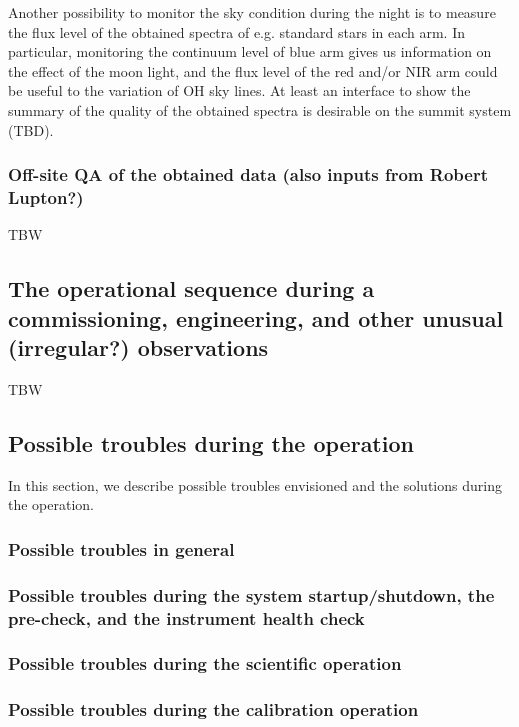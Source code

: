 \documentclass[a4paper]{article}
\begin{document}
Another possibility to monitor the sky condition during the night is to measure the flux level of the obtained spectra of e.g. standard stars in each arm. In particular, monitoring the continuum level of blue arm gives us information on the effect of the moon light, and the flux level of the red and/or NIR arm could be useful to the variation of OH sky lines. At least an interface to show the summary of the quality of the obtained spectra is desirable on the summit system (TBD).\\

\subsubsection{Off-site QA of the obtained data (also inputs from Robert Lupton?)}
TBW

\subsection{The operational sequence during a commissioning, engineering, and other unusual (irregular?) observations \label{sec:detail_ope_plan:engineering}}
TBW

\subsection{Possible troubles during the operation}
In this section, we describe possible troubles envisioned and the solutions during the operation.
\subsubsection{Possible troubles in general}
\subsubsection{Possible troubles during the system startup/shutdown, the pre-check, and the instrument health check}
\subsubsection{Possible troubles during the scientific operation}
\subsubsection{Possible troubles during the calibration operation}
\end{document}
